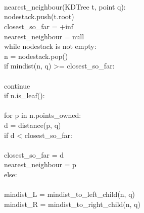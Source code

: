 \begin{figure}
\begin{pcode}
 \\
 \\
 \\
\func nearest\_neighbour(KDTree t, point q): \\
\>   nodestack.push(t.root) \\
\>   closest\_so\_far = +inf \\
\>   nearest\_neighbour = null \\
\>   while nodestack is not empty: \\
\>\>      n = nodestack.pop() \\
\>\>      if mindist(n, q) >= closest\_so\_far: \\
\>\>\>          \\
\>\>\>         continue \\
\>\>      if n.is\_leaf(): \\
\>\>\>          \\
\>\>\>         for p in n.points\_owned: \\
\>\>\>\>            d = distance(p, q) \\
\>\>\>\>            if d < closest\_so\_far: \\
\>\>\>\>\>                \\
\>\>\>\>\>               closest\_so\_far = d \\
\>\>\>\>\>               nearest\_neighbour = p \\
\>\>      else: \\
\>\>\>          \\
\>\>\>         mindist\_L = mindist\_to\_left\_child(n, q) \\
\>\>\>         mindist\_R = mindist\_to\_right\_child(n, q) \\
\>\>\>          \\
\>\>\>          \\

\end{pcode}
\end{figure}
